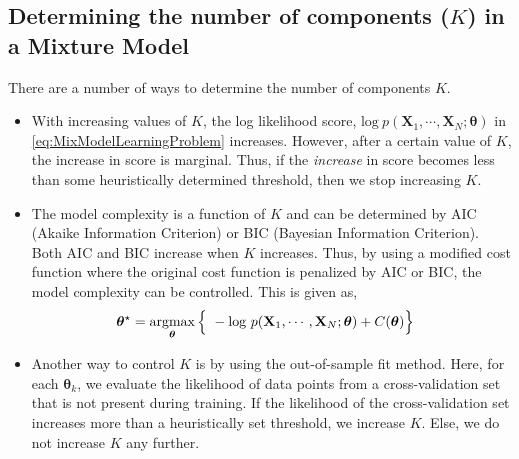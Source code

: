\documentclass[twoside,11pt,a4paper]{book}
\newcommand{\data}[1]{\mathbf{#1}}
\begin{document}
\subsection{Determining the number of components ($K$) in a Mixture Model}
There are a number of ways to determine the number of components $K$.
\begin{itemize}
\item With increasing values of $K$, the log likelihood score,  $\text{log} \ p(\data{X}_{1}, \cdots, \data{X}_{N}; \bm{\theta})$ in \eqref{eq:MixModelLearningProblem} increases. However, after a certain value of $K$, the increase in score is marginal. Thus, if the \textit{increase} in score becomes less than some heuristically determined threshold, then we stop increasing $K$.
\item The model complexity is a function of $K$ and can be determined by AIC (Akaike Information Criterion) or BIC (Bayesian Information Criterion). Both AIC and BIC increase when $K$ increases. Thus, by using a modified cost function where the original cost function is penalized by AIC or BIC, the model complexity can be controlled. This is given as,
\begin{align}
\bm{\theta}^{\star} &= \argmax_{\bm{\theta}} \Big\{ \ - \text{log} \ p(\data{X}_{1}, \cdots, \data{X}_{N}; \bm{\theta}) + C(\bm{\theta}) \Big\}
\end{align}
\item Another way to control $K$ is by using the out-of-sample fit method. Here, for each $\bm{\theta}_{k}$,  we evaluate the likelihood of data points from a cross-validation set that is not present during training. If the likelihood of the cross-validation set increases more than a heuristically set threshold, we increase $K$. Else, we do not increase $K$ any further.
\end{itemize} 



\end{document}
